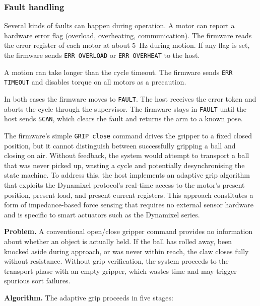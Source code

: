 \subsubsection*{Fault handling}

Several kinds of faults can happen during operation.
A motor can report a hardware error flag (overload, overheating,
communication). The firmware reads the error register of each motor
at about 5~Hz during motion. If any flag is set, the firmware sends
\texttt{ERR OVERLOAD} or \texttt{ERR OVERHEAT} to the host.

A motion can take longer than the cycle timeout. The firmware sends
\texttt{ERR TIMEOUT} and disables torque on all motors as a
precaution.

In both cases the firmware moves to \texttt{FAULT}. The host receives
the error token and aborts the cycle through the supervisor.
The firmware stays in
\texttt{FAULT} until the host sends \texttt{SCAN}, which clears the
fault and returns the arm to a known pose.



The firmware's simple \texttt{GRIP close} command drives the gripper
to a fixed closed position, but it cannot distinguish between
successfully gripping a ball and closing on air. Without feedback,
the system would attempt to transport a ball that was never picked
up, wasting a cycle and potentially desynchronising the state
machine. To address this, the host implements an adaptive grip
algorithm that exploits the Dynamixel protocol's real-time access
to the motor's present position, present load, and present current
registers. This approach constitutes a form of impedance-based
force sensing that requires no external sensor hardware and is
specific to smart actuators such as the Dynamixel series.

\textbf{Problem.} A conventional open/close gripper command
provides no information about whether an object is actually held.
If the ball has rolled away, been knocked aside during approach,
or was never within reach, the claw closes fully without
resistance. Without grip verification, the system proceeds to the
transport phase with an empty gripper, which wastes time and may
trigger spurious sort failures.

\textbf{Algorithm.} The adaptive grip proceeds in five stages:

